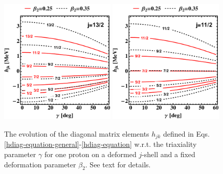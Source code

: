 \begin{figure}
    \centering
    \includegraphics[width=0.49\textwidth]{Chapters/Figures/hdiag-gamma-1.pdf}
    \includegraphics[width=0.49\textwidth]{Chapters/Figures/hdiag-gamma-2.pdf}
    \caption{The evolution of the diagonal matrix elements $h_{jk}$ defined in Eqs. \ref{hdiag-equation-general}-\ref{hdiag-equation} w.r.t. the triaxiality parameter $\gamma$ for one proton on a deformed $j$-shell and a fixed deformation parameter $\beta_2$. See text for details.}
    \label{hdiag-gamma-evolution}
\end{figure}

